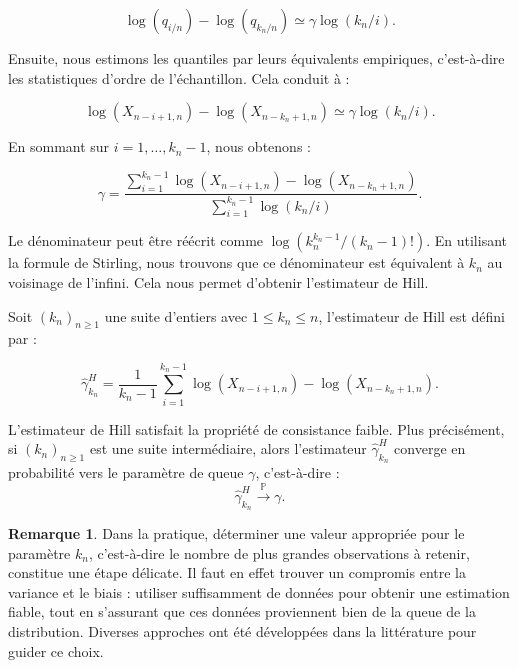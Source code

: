 \documentclass{article}
\theoremstyle{plain}
\theoremstyle{definition}
\newtheorem{remark}[definition]{Remarque}
\theoremstyle{plain}
\begin{document}
\[
\log(q_{i/n}) - \log(q_{k_n/n}) \simeq \gamma \log(k_n/i).
\]

\noindent Ensuite, nous estimons les quantiles par leurs équivalents empiriques, c'est-à-dire les statistiques d'ordre de l'échantillon. Cela conduit à :

\[
\log(X_{n - i + 1, n}) - \log(X_{n - k_n + 1, n}) \simeq \gamma \log(k_n / i).
\]

\noindent En sommant sur \(i = 1, \ldots, k_n - 1\), nous obtenons :

\[
\gamma = \frac{\sum_{i=1}^{k_n - 1} \log(X_{n - i + 1, n}) - \log(X_{n - k_n + 1, n})}{\sum_{i=1}^{k_n - 1} \log(k_n / i)}.
\]

\noindent Le dénominateur peut être réécrit comme \(\log(k_n^{k_n - 1}/(k_n - 1)!)\). En utilisant la formule de Stirling, nous trouvons que ce dénominateur est équivalent à \(k_n\) au voisinage de l'infini. Cela nous permet d'obtenir l'estimateur de Hill.

\noindent Soit $(k_n)_{n \geq 1}$ une suite d'entiers avec $1 \leq k_n \leq n$, l’estimateur de Hill est défini par :

\[
\hat{\gamma}^{H}_{k_n} = \frac{1}{k_n - 1} \sum_{i=1}^{k_n - 1} \log(X_{n - i + 1, n}) - \log(X_{n - k_n + 1, n}).
\]

\noindent L’estimateur de Hill satisfait la propriété de consistance faible. Plus précisément, si $(k_n)_{n \geq 1}$ est une suite intermédiaire, alors l’estimateur $\hat{\gamma}^{H}_{k_n}$ converge en probabilité vers le paramètre de queue $\gamma$, c’est-à-dire :
\[
\hat{\gamma}^{H}_{k_n} \xrightarrow{\mathbb{P}} \gamma.
\]

\begin{remark}
	Dans la pratique, déterminer une valeur appropriée pour le paramètre $k_n$, c’est-à-dire le nombre de plus grandes observations à retenir, constitue une étape délicate. Il faut en effet trouver un compromis entre la variance et le biais : utiliser suffisamment de données pour obtenir une estimation fiable, tout en s’assurant que ces données proviennent bien de la queue de la distribution. Diverses approches ont été développées dans la littérature pour guider ce choix.
\end{remark}
\end{document}
